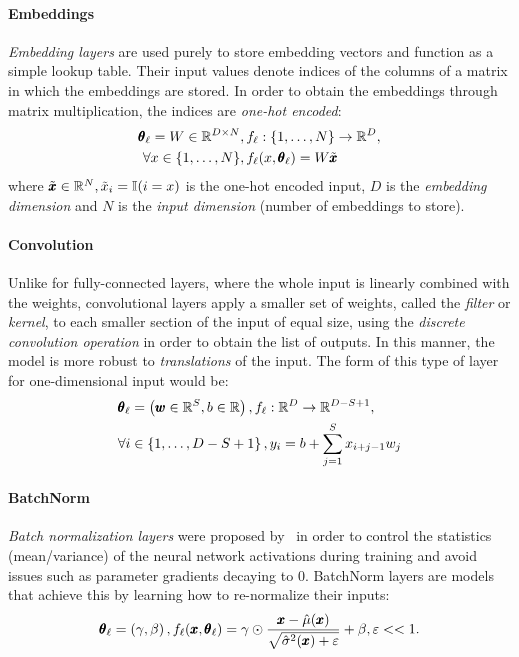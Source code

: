 \paragraph{Embeddings} \emph{Embedding layers} are used purely to store embedding vectors and function as a simple lookup table. Their input values denote indices of the columns of a matrix in which the embeddings are stored. In order to obtain the embeddings through matrix multiplication, the indices are \emph{one-hot encoded}: 
\begin{align}
    \begin{split}
        \pmb{\theta}_{\ell} = W \in \mathbb{R}^{D \times N}&, f_{\ell}: \mathopen{}\left\{1,\dots,N\right\} \to \mathbb{R}^D, \\
        \forall x \in \mathopen{}\left\{1,\dots,N\right\}&, f_{\ell}\mathopen{}\left(x, \pmb{\theta}_{\ell}\right) = W \tilde{\pmb{x}}
    \end{split}
\end{align}
where $\tilde{\pmb{x}} \in \mathbb{R}^N, \tilde{x}_i = \mathbb{I}\mathopen{}\left(i = x\right)$ is the one-hot encoded input, $D$ is the \emph{embedding dimension} and $N$ is the \emph{input dimension} (number of embeddings to store).

\paragraph{Convolution} Unlike for fully-connected layers, where the whole input is linearly combined with the weights, convolutional layers apply a smaller set of weights, called the \emph{filter} or \emph{kernel}, to each smaller section of the input of equal size, using the \emph{discrete convolution operation} in order to obtain the list of outputs. In this manner, the model is more robust to \emph{translations} of the input. The form of this type of layer for one-dimensional input would be: 
\begin{align}
\begin{split}
\pmb{\theta}_{\ell} &= \mathopen{}\left(\pmb{w} \in \mathbb{R}^{S}, b \in \mathbb{R}\right), f_{\ell}: \mathbb{R}^{D} \to \mathbb{R}^{D-S+1}, \\
\forall i &\in \mathopen{}\left\{1,\dots,D-S+1\right\}, y_i = b + \sum_{j=1}^{S}{x_{i+j-1}w_j} 
\end{split}
\end{align}

\paragraph{BatchNorm} \emph{Batch normalization layers} were proposed by~\cite{ioffe_batch_2015} in order to control the statistics (mean/variance) of the neural network activations during training and avoid issues such as parameter gradients decaying to $0$. BatchNorm layers are models that achieve this by learning how to re-normalize their inputs: 
\begin{equation}
\pmb{\theta}_{\ell} = \mathopen{}\left(\gamma, \beta\right), f_{\ell}\mathopen{}\left(\pmb{x}, \pmb{\theta}_{\ell}\right) = \gamma \odot \frac{\pmb{x}-\hat{\mu}\mathopen{}\left(\pmb{x}\right)}{\sqrt{\hat{\sigma}^2\mathopen{}\left(\pmb{x}\right) + \varepsilon}} + \beta, \varepsilon << 1.
\end{equation}

